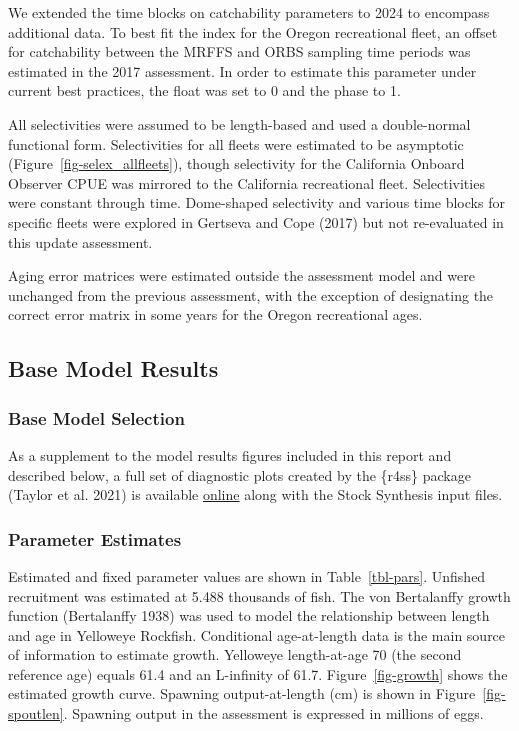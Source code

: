 \documentclass[
]{scrartcl}
\begin{document}
We extended the time blocks on catchability parameters to 2024 to
encompass additional data. To best fit the index for the Oregon
recreational fleet, an offset for catchability between the MRFFS and
ORBS sampling time periods was estimated in the 2017 assessment. In
order to estimate this parameter under current best practices, the float
was set to 0 and the phase to 1.

All selectivities were assumed to be length-based and used a
double-normal functional form. Selectivities for all fleets were
estimated to be asymptotic (Figure~\ref{fig-selex_allfleets}), though
selectivity for the California Onboard Observer CPUE was mirrored to the
California recreational fleet. Selectivities were constant through time.
Dome-shaped selectivity and various time blocks for specific fleets were
explored in Gertseva and Cope (2017) but not re-evaluated in this update
assessment.

Aging error matrices were estimated outside the assessment model and
were unchanged from the previous assessment, with the exception of
designating the correct error matrix in some years for the Oregon
recreational ages.

\subsection{Base Model Results}\label{base-model-results}

\subsubsection{Base Model Selection}\label{base-model-selection}

As a supplement to the model results figures included in this report and
described below, a full set of diagnostic plots created by the \{r4ss\}
package (Taylor et al. 2021) is available
\href{https://github.com/rclairer/Sebastes_ruberrimus_2025}{online}
along with the Stock Synthesis input files.

\subsubsection{Parameter Estimates}\label{parameter-estimates}

Estimated and fixed parameter values are shown in Table~\ref{tbl-pars}.
Unfished recruitment was estimated at 5.488 thousands of fish. The von
Bertalanffy growth function (Bertalanffy 1938) was used to model the
relationship between length and age in Yelloweye Rockfish. Conditional
age-at-length data is the main source of information to estimate growth.
Yelloweye length-at-age 70 (the second reference age) equals 61.4 and an
L-infinity of 61.7. Figure~\ref{fig-growth} shows the estimated growth
curve. Spawning output-at-length (cm) is shown in
Figure~\ref{fig-spoutlen}. Spawning output in the assessment is
expressed in millions of eggs.
\end{document}

